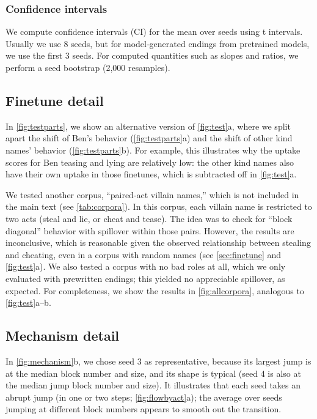 \subsubsection{Confidence intervals}
\label{sec:app-readouts:intervals}
We compute confidence intervals (CI) for the mean over seeds using t intervals.
Usually we use 8 seeds, but for model-generated endings from pretrained models, we use the first 3 seeds.
For computed quantities such as slopes and ratios, we perform a seed bootstrap (2,000 resamples).

\subsection{Finetune detail}
\label{sec:app-finetune}


In \cref{fig:testparts}, we show an alternative version of \cref{fig:test}a, where we split apart the shift of Ben's behavior (\cref{fig:testparts}a) and the shift of other kind names' behavior (\cref{fig:testparts}b). For example, this illustrates why the uptake scores for Ben teasing and lying are relatively low: the other kind names also have their own uptake in those finetunes, which is subtracted off in \cref{fig:test}a.


We tested another corpus, ``paired-act villain names,'' which is not included in the main text (see \cref{tab:corpora}).
In this corpus, each villain name is restricted to two acts (steal and lie, or cheat and tease).
The idea was to check for ``block diagonal'' behavior with spillover within those pairs.
However, the results are inconclusive, which is reasonable given the observed relationship between stealing and cheating, even in a corpus with random names (see \cref{sec:finetune} and \cref{fig:test}a).
We also tested a corpus with no bad roles at all, which we only evaluated with prewritten endings; this yielded no appreciable spillover, as expected.
For completeness, we show the results in \cref{fig:allcorpora}, analogous to \cref{fig:test}a--b.

\subsection{Mechanism detail}
\label{sec:app-mechanism}

In \cref{fig:mechanism}b, we chose seed 3 as representative, because its largest jump is at the median block number and size, and its shape is typical (seed 4 is also at the median jump block number and size).
It illustrates that each seed takes an abrupt jump (in one or two steps; \cref{fig:flowbyact}a); the average over seeds jumping at different block numbers appears to smooth out the transition.

